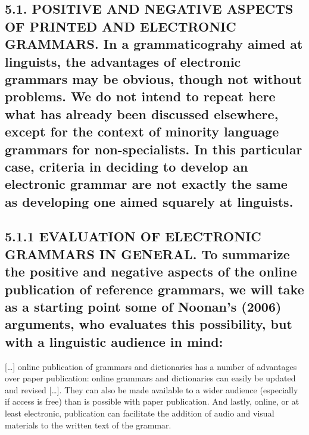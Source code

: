 \documentclass[letterpaper]{article}
\begin{document}
\subsection[5.1. POSITIVE AND NEGATIVE ASPECTS OF PRINTED AND ELECTRONIC GRAMMARS. In a grammaticograhy aimed at linguists, the advantages of electronic grammars may be obvious, though not without problems. We do not intend to repeat here what has already been discussed elsewhere, except for the context of minority language grammars for non{}-specialists. In this particular case, criteria in deciding to develop an electronic grammar are not exactly the same as developing one aimed squarely at linguists.]{5.1. POSITIVE AND NEGATIVE ASPECTS OF PRINTED AND ELECTRONIC GRAMMARS. \textmd{In a grammaticograhy aimed at linguists, }\textmd{the advantages }\textmd{of electronic grammars may be obvious, though }\textmd{not without }\textmd{problems. We do not intend to repeat here what ha}\textmd{s}\textmd{ already been discussed elsewhere}\textmd{,}\footnotemark{}\textmd{ except for the context of minority language grammars for non-specialists. In }\textmd{this particular }\textmd{case, criteria }\textmd{in }\textmd{decid}\textmd{ing}\textmd{ to }\textmd{develop an }\textmd{electronic grammar}\textmd{ }\textmd{are not exactly the same }\textmd{as developing one aimed squarely at }\textmd{linguists.}}
\subsection[5.1.1 EVALUATION OF ELECTRONIC GRAMMARS IN GENERAL. To summarize the positive and negative aspects of the online publication of reference grammars, we will take as a starting point some of Noonan{\textquoteright}s (2006) arguments, who evaluates this possibility, but with a linguistic audience in mind: ]{5.1.1 EVALUATION OF ELECTRONIC GRAMMARS IN GENERAL. \textmd{To summarize }\textmd{the }\textmd{positive and negative aspects of}\textmd{ the }\textmd{online publication of reference grammars, we will take as a starting point some of Noonan{\textquoteright}s}\textmd{ (2006)}\textmd{ arguments, who }\textmd{evaluates this possibility,}\textmd{ but with }\textmd{a }\textmd{linguist}\textmd{ic}\textmd{ audience in mind: }}
[{\dots}] online publication of grammars and dictionaries has a number of advantages over paper publication: online grammars and dictionaries can easily be updated and revised [{\dots}]. They can also be made available to a wider audience (especially if access is free) than is possible with paper publication. And lastly, online, or at least electronic, publication can facilitate the addition of audio and visual materials to the written text of the grammar. 
\end{document}
